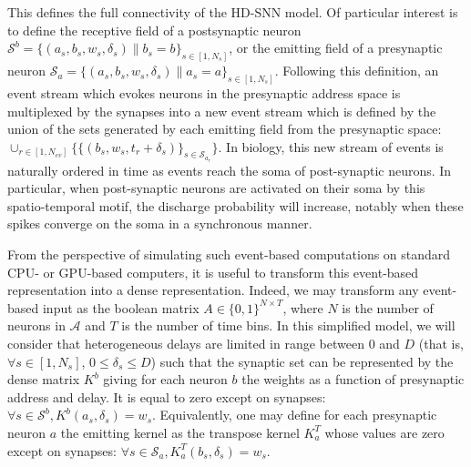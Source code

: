 \documentclass[runningheads]{llncs}
\newcommand{\presynaddr}{a} %
\newcommand{\postsynaddr}{b} %
\newcommand{\numevent}{N_{ev}} %
\newcommand{\presynaddrspace}{\mathcal{A}} %
\newcommand{\arank}{r} %
\newcommand{\synapse}{\mathcal{S}} %
\newcommand{\synapticweight}{w} %
\newcommand{\synapticdelay}{\delta} %
\newcommand{\ranksyn}{s} %
\newcommand{\Nsyn}{N_{s}} %
\newcommand{\timev}{t} %
\newcommand{\kernel}{K} %
\begin{document}
This defines the full connectivity of the HD-SNN model. Of particular interest is to define the receptive field of a postsynaptic neuron $\synapse^\postsynaddr =  \{(\presynaddr_\ranksyn, \postsynaddr_\ranksyn, \synapticweight_\ranksyn, \synapticdelay_\ranksyn) \| \postsynaddr_\ranksyn=\postsynaddr\}_{\ranksyn \in [1,\Nsyn]} $, or the emitting field of a presynaptic neuron $\synapse_\presynaddr =  \{(\presynaddr_\ranksyn, \postsynaddr_\ranksyn, \synapticweight_\ranksyn, \synapticdelay_\ranksyn) \| \presynaddr_\ranksyn=\presynaddr\}_{\ranksyn \in [1,\Nsyn]}$. Following this definition, an event stream which evokes neurons in the presynaptic address space is multiplexed by the synapses into a new event stream which is defined by the union of the sets generated by each emitting field from the presynaptic space: 
$ \cup_{\arank \in [1,\numevent]} \{ \{(\postsynaddr_\ranksyn, \synapticweight_\ranksyn, \timev_\arank + \synapticdelay_\ranksyn) \}_{ \ranksyn \in \synapse_{\presynaddr_\arank}} \}$. In biology, this new stream of events is naturally ordered in time as events reach the soma of post-synaptic neurons. In particular, when post-synaptic neurons are activated on their soma by this spatio-temporal motif, the discharge probability will increase, notably when these spikes converge on the soma in a synchronous manner. 

From the perspective of simulating such event-based computations on standard CPU- or GPU-based computers, it is useful to transform this event-based representation into a dense representation. Indeed, we may transform any event-based input as the boolean matrix $A \in \{0, 1 \}^{N\times T}$, where $N$ is the number of neurons in $\presynaddrspace$ and $T$ is the number of time bins. In this simplified model, we will consider that heterogeneous delays are limited in range between $0$ and $D$ (that is, $\forall {\ranksyn \in [1,\Nsyn]}$, $0 \le \synapticdelay_\ranksyn \le D$) such that the synaptic set can be represented by the dense matrix $\kernel^\postsynaddr$ giving for each neuron $\postsynaddr$ the weights as a function of presynaptic address and delay. It is equal to zero except on synapses: $\forall {\ranksyn \in \synapse^\postsynaddr}, \kernel^\postsynaddr(\presynaddr_\ranksyn,  \synapticdelay_\ranksyn) = \synapticweight_\ranksyn$. Equivalently, one may define for each presynaptic neuron $\presynaddr$ the emitting kernel as the transpose kernel $\kernel^T_\presynaddr$ whose values are zero except on synapses:  $\forall {\ranksyn \in \synapse_\presynaddr}, \kernel^T_\presynaddr(\postsynaddr_\ranksyn,  \synapticdelay_\ranksyn) = \synapticweight_\ranksyn$.
\end{document}

